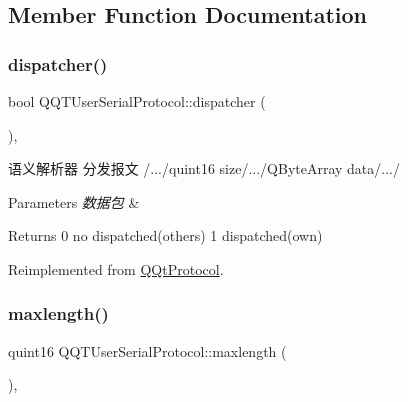 \subsection{Member Function Documentation}
\mbox{\label{class_q_q_t_user_serial_protocol_ac851e9026524ef8081f7980480d83237}} 
\subsubsection{\texorpdfstring{dispatcher()}{dispatcher()}}
{\footnotesize\ttfamily bool Q\+Q\+T\+User\+Serial\+Protocol\+::dispatcher (\begin{DoxyParamCaption}\item[{const Q\+Byte\+Array \&}]{ }\end{DoxyParamCaption})\hspace{0.3cm}{\ttfamily [override]}, {\ttfamily [virtual]}}



语义解析器 分发报文 /.../quint16 size/.../\+Q\+Byte\+Array data/.../ 


\begin{DoxyParams}{Parameters}
{\em 数据包} & \\
\hline
\end{DoxyParams}
\begin{DoxyReturn}{Returns}
0 no dispatched(others) 1 dispatched(own) 
\end{DoxyReturn}


Reimplemented from \mbox{\hyperlink{class_q_qt_protocol_a35a69c4b89c8cf7459038f40d75e0dc9}{Q\+Qt\+Protocol}}.

\mbox{\label{class_q_q_t_user_serial_protocol_ad564c1976be71019499ea1de4fd51a12}} 
\subsubsection{\texorpdfstring{maxlength()}{maxlength()}}
{\footnotesize\ttfamily quint16 Q\+Q\+T\+User\+Serial\+Protocol\+::maxlength (\begin{DoxyParamCaption}{ }\end{DoxyParamCaption})\hspace{0.3cm}{\ttfamily [override]}, {\ttfamily [virtual]}}



